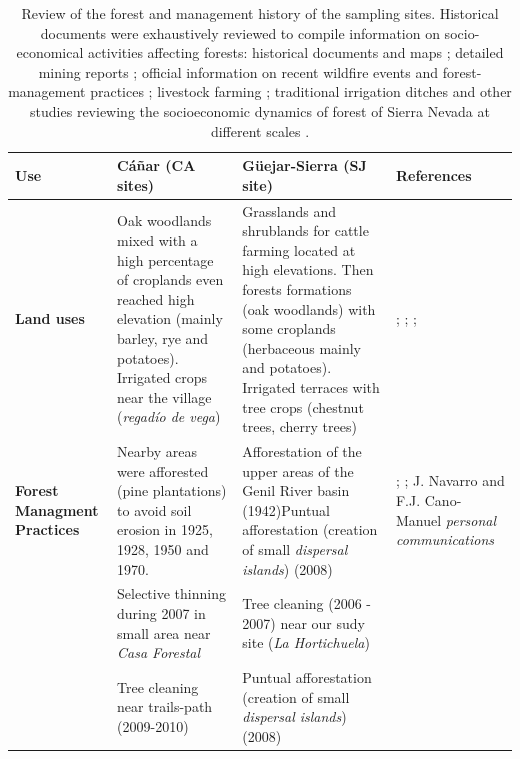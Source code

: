\begin{table} 
\caption{Review of the forest and management history of the sampling sites. Historical documents were exhaustively reviewed to compile information on socio-economical activities affecting forests: historical documents and maps \autocite[\emph{e.g.}][]{Titos1990}; detailed mining reports \autocite[\emph{e.g.}][]{Maestre1858}; official information on recent wildfire events and forest-management practices \autocite[\emph{e.g.}][]{Bonet2016obsnevforest}; livestock farming \autocite[\emph{e.g.}][]{MorenoLlorca2016}; traditional irrigation ditches \autocite[\emph{e.g.}][]{RuizRuiz2017} and other studies reviewing the socioeconomic dynamics of forest of Sierra Nevada at different scales \autocite[\emph{e.g.}][]{JimenezOlivencia2015}.}
\label{tab:dendro:reviewusos}
\centering
\begingroup\tiny\selectfont
\begin{tabular}{
>{\centering\arraybackslash}p{}>{\raggedright\arraybackslash}p{}>{\raggedright\arraybackslash}p{}>{\raggedright\arraybackslash}p{}}
\toprule
\textbf{Use} & \textbf{Cáñar (CA sites)} & \textbf{Güejar-Sierra (SJ site)} & \textbf{References} \\
\midrule
\textbf{Land uses} & Oak woodlands mixed with a high percentage of croplands even reached high elevation (mainly barley, rye and potatoes). Irrigated crops near the village (\textit{regadío de vega}) & Grasslands and shrublands for cattle farming located at high elevations. Then forests formations (oak woodlands) with some croplands (herbaceous mainly and potatoes). Irrigated terraces with tree crops (chestnut trees, cherry trees) & \textcite{Calatrava2019}; \textcite{JimenezOlivencia2015}; \textcite{MorenoLlorca2016}; \textcite{2015Zoido}\\ \midrule
\textbf{Forest Managment Practices} & Nearby areas were afforested (pine plantations) to avoid soil erosion in 1925, 1928, 1950 and 1970. & Afforestation of the upper areas of the Genil River basin (1942)Puntual afforestation (creation of small \textit{dispersal islands}) (2008) & \textcite{Bonet2016obsnevforest}; \textcite{MorenoLlorca2016}; J. Navarro and F.J. Cano-Manuel \textit{personal communications} \\
 & Selective thinning during 2007 in small area near \textit{Casa Forestal} & Tree cleaning (2006 - 2007) near our sudy site (\textit{La Hortichuela}) &  \\
 & Tree cleaning near trails-path (2009-2010) & Puntual afforestation (creation of small \textit{dispersal islands}) (2008) &  \\ \midrule

\end{tabular}
\end{table}
